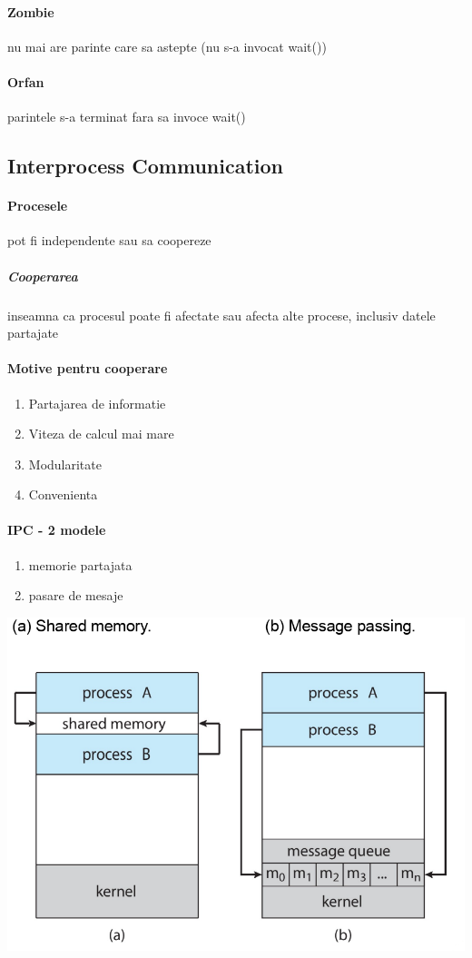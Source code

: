 \documentclass{article}
\begin{document}
\paragraph*{Zombie} nu mai are parinte care sa astepte (nu s-a invocat wait())
\paragraph*{Orfan} parintele s-a terminat fara sa invoce wait()

\subsection*{Interprocess Communication}
\paragraph*{Procesele} pot fi independente sau sa coopereze
\subparagraph*{Cooperarea} inseamna ca procesul poate fi afectate sau afecta alte procese, inclusiv datele partajate
\paragraph*{Motive pentru cooperare}
\begin{enumerate}
    \item Partajarea de informatie
    \item Viteza de calcul mai mare
    \item Modularitate
    \item Convenienta
\end{enumerate}
\paragraph*{IPC - 2 modele}
\begin{enumerate}
    \item memorie partajata
    \item pasare de mesaje
\end{enumerate}

\begin{center}
    \includegraphics[scale=0.3]{5_ipc.png}
\end{center}
\end{document}
